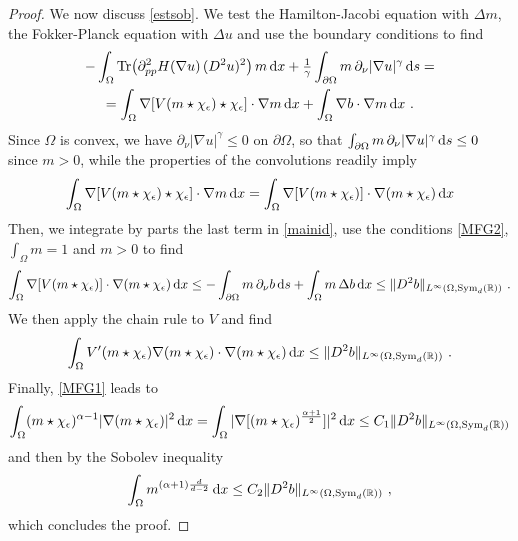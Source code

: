 \documentclass[10pt, a4paper, reqno, oneside]{amsart}
\theoremstyle{plain}
\theoremstyle{definition}
\theoremstyle{plain}
\theoremstyle{definition}
\theoremstyle{plain}
\renewcommand{\=}{:=}
\begin{document}
\begin{proof}
We now discuss \eqref{estsob}. We test the Hamilton-Jacobi equation with $\Delta m$, the Fokker-Planck equation with $\Delta u$ and use the boundary conditions to find 
\begin{multline} \label{mainid}
-\int_\Omega \mathrm{Tr}\big(\partial_{pp}^2H(\nabla u)\, (D^2u)^2\big)\,m\,{\rm d}x
+\tfrac1\gamma \int_{\partial\Omega}m\,\partial_\nu |\nabla u|^\gamma\,{\rm d}s
= \\
= \int_\Omega \nabla [V(m\star\chi_\epsilon)\star \chi_\epsilon]\cdot \nabla m \,{\rm d}x+\int_\Omega \nabla b\cdot \nabla m\,{\rm d}x \,\, .
\end{multline}
Since $\Omega$ is convex, we have $\partial_\nu |\nabla u|^\gamma\leq0$ on $\partial\Omega$, so that $\int_{\partial\Omega}m\,\partial_\nu |\nabla u|^\gamma\,{\rm d}s\leq0$ since $m>0$, while the properties of the convolutions readily imply
$$
\int_\Omega \nabla [V(m\star\chi_\epsilon)\star \chi_\epsilon]\cdot \nabla m\,{\rm d}x
=\int_\Omega \nabla [V(m\star\chi_\epsilon)]\cdot \nabla (m\star \chi_\epsilon)\,{\rm d}x
$$
Then, we integrate by parts the last term in \eqref{mainid}, use the conditions \eqref{MFG2}, $\int_\Omega m=1$ and $m>0$ to find
$$
\int_\Omega \nabla [V(m\star\chi_\epsilon)]\cdot \nabla (m\star \chi_\epsilon)\,{\rm d}x
\leq -\int_{\partial\Omega} m\,\partial_\nu b\,{\rm d}s +\int_\Omega m\,\Delta b\,{\rm d}x
\leq \| D^2b \|_{L^\infty(\Omega,{\rm Sym}_d(\mathbb{R}))} \,\, .
$$
We then apply the chain rule to $V$ and find 
$$
\int_\Omega V'(m\star \chi_\epsilon)\nabla(m\star \chi_\epsilon)\cdot \nabla(m\star \chi_\epsilon)\,{\rm d}x
\leq \| D^2b \|_{L^\infty(\Omega,{\rm Sym}_d(\mathbb{R}))} \,\, .
$$
Finally, \eqref{MFG1} leads to
$$
\int_\Omega (m\star \chi_\epsilon)^{\alpha-1}|\nabla(m\star \chi_\epsilon)|^2 \,{\rm d}x
= \int_\Omega |\nabla[(m\star\chi_\epsilon)^{\frac{\alpha+1}{2}}]|^2\,{\rm d}x
\leq C_1 \| D^2b \|_{L^\infty(\Omega,{\rm Sym}_d(\mathbb{R}))}
$$
and then by the Sobolev inequality
$$
\int_\Omega m^{(\alpha+1)\frac{d}{d-2}}\,{\rm d}x \leq C_2 \| D^2b \|_{L^\infty(\Omega,{\rm Sym}_d(\mathbb{R}))} \,\, ,
$$
which concludes the proof.
\end{proof}
\end{document}
